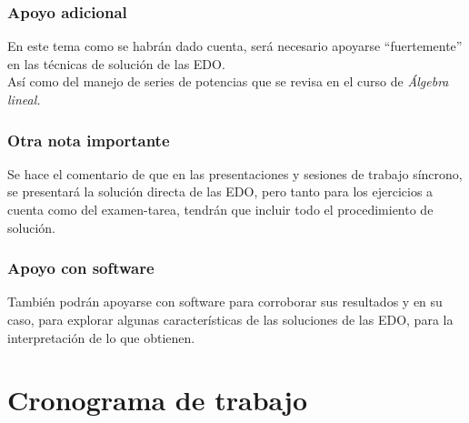 \documentclass[12pt]{beamer}
\begin{document}
\begin{frame}
\frametitle{Apoyo adicional}
En este tema como se habrán dado cuenta, será necesario apoyarse \enquote{fuertemente} en las técnicas de solución de las EDO.
\\
\bigskip
\pause
Así como del manejo de series de potencias que se revisa en el curso de \emph{Álgebra lineal.}
\end{frame}
\begin{frame}
\frametitle{Otra nota importante}
Se hace el comentario de que en las presentaciones y sesiones de trabajo síncrono, se presentará la solución directa de las EDO, pero tanto para los ejercicios a cuenta como del examen-tarea, tendrán que incluir todo el procedimiento de solución.
\end{frame}
\begin{frame}
\frametitle{Apoyo con software}
También podrán apoyarse con software para corroborar sus resultados y en su caso, para explorar algunas características de las soluciones de las EDO, para la interpretación de lo que obtienen.
\end{frame}
\section{Cronograma de trabajo}
\end{document}
